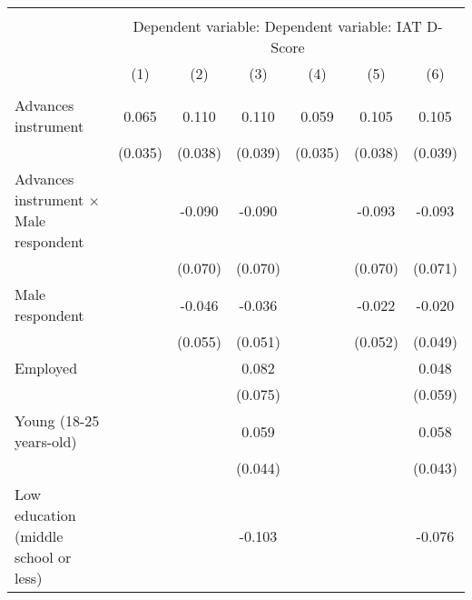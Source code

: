 \begin{tabular}{l*{6}{c}} \hline\hline \\[-1.8ex] & \multicolumn{6}{c}{Dependent variable: Dependent variable: IAT D-Score} \\ 
                    &\multicolumn{1}{c}{(1)}         &\multicolumn{1}{c}{(2)}         &\multicolumn{1}{c}{(3)}         &\multicolumn{1}{c}{(4)}         &\multicolumn{1}{c}{(5)}         &\multicolumn{1}{c}{(6)}         \\
 \hline \\[-1ex]
Advances instrument &       0.065\sym{*}  &       0.110\sym{***}&       0.110\sym{***}&       0.059\sym{*}  &       0.105\sym{***}&       0.105\sym{***}\\
                    &     (0.035)         &     (0.038)         &     (0.039)         &     (0.035)         &     (0.038)         &     (0.039)         \\
[1em]
Advances instrument $\times$ Male respondent&                     &      -0.090         &      -0.090         &                     &      -0.093         &      -0.093         \\
                    &                     &     (0.070)         &     (0.070)         &                     &     (0.070)         &     (0.071)         \\
[1em]
Male respondent     &                     &      -0.046         &      -0.036         &                     &      -0.022         &      -0.020         \\
                    &                     &     (0.055)         &     (0.051)         &                     &     (0.052)         &     (0.049)         \\
[1em]
Employed            &                     &                     &       0.082         &                     &                     &       0.048         \\
                    &                     &                     &     (0.075)         &                     &                     &     (0.059)         \\
[1em]
Young (18-25 years-old)&                     &                     &       0.059         &                     &                     &       0.058         \\
                    &                     &                     &     (0.044)         &                     &                     &     (0.043)         \\
[1em]
Low education (middle school or less)&                     &                     &      -0.103\sym{**} &                     &                     &      -0.076         \\

\end{tabular}
